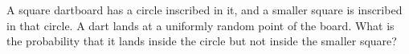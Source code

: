 A square dartboard has a circle inscribed in it, and a smaller square is inscribed in that circle. A dart lands at a uniformly random point of the board. What is the probability that it lands inside the circle but not inside the smaller square?
